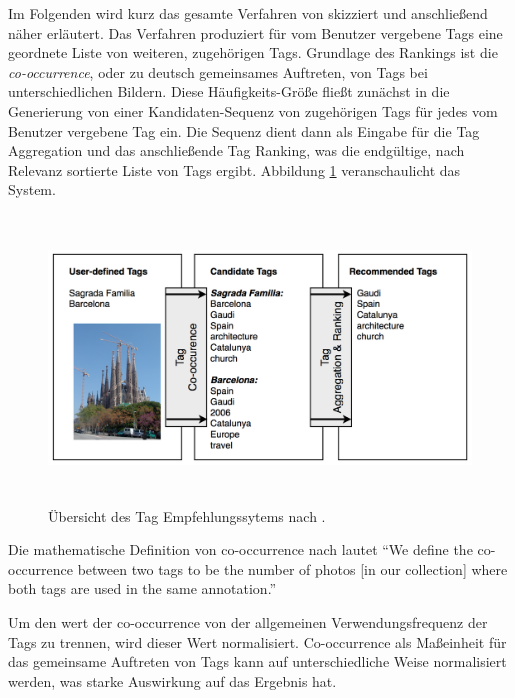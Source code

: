 Im Folgenden wird kurz das gesamte Verfahren von \cite{collectiveKnowledge} skizziert und anschließend näher erläutert. Das Verfahren produziert für vom Benutzer vergebene Tags eine geordnete Liste von weiteren, zugehörigen Tags. Grundlage des Rankings ist die \emph{co-occurrence}, oder zu deutsch gemeinsames Auftreten, von Tags bei unterschiedlichen Bildern. Diese Häufigkeits-Größe fließt zunächst in die Generierung von einer Kandidaten-Sequenz von zugehörigen Tags für jedes vom Benutzer vergebene Tag ein. Die Sequenz dient dann als Eingabe für die Tag Aggregation und das anschließende Tag Ranking, was die endgültige, nach Relevanz sortierte Liste von Tags ergibt. Abbildung \ref{fig:images_collective_knowledge_system_overview} veranschaulicht das System.

\begin{figure}[htbp]
  \centering
    \includegraphics[height=3in]{images/collective_knowledge_system_overview.png}
  \caption{Übersicht des Tag Empfehlungssytems nach \cite{collectiveKnowledge}.}
  \label{fig:images_collective_knowledge_system_overview}
\end{figure}





Die mathematische Definition von co-occurrence nach \cite{collectiveKnowledge} lautet ``We define the co-occurrence between two tags to be the number of photos [in our collection] where both tags are used in the same annotation.''
 
 
Um den wert der co-occurrence von der allgemeinen Verwendungsfrequenz der Tags zu trennen, wird dieser Wert normalisiert. Co-occurrence als Maßeinheit für das gemeinsame Auftreten von Tags kann auf unterschiedliche Weise normalisiert werden, was starke Auswirkung auf das Ergebnis hat.

